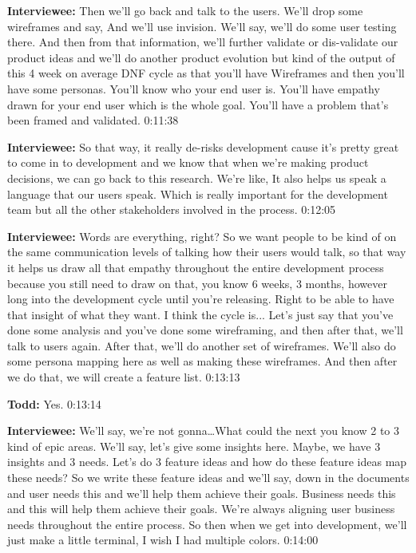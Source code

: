 \textbf{Interviewee:} Then we'll go back and talk to the users. We'll drop some wireframes and say,  And we'll use invision.  We'll say,  we'll do some user testing there.  And then from that information, we'll further validate or dis-validate our product ideas and we'll do another product evolution but kind of the output of this 4 week on average DNF cycle as that you'll have Wireframes and then you'll have some personas. You'll know who your end user is.  You'll have empathy drawn for your end user which is the whole goal. You'll have a problem that's been framed and validated.   0:11:38

\textbf{Interviewee:} So that way, it really de-risks development cause it's pretty great to come in to development and we know that when we're making product decisions, we can go back to this research.  We're like,  It also helps us speak a language that our users speak.  Which is really important for the development team but all the other stakeholders involved in the process.  0:12:05

\textbf{Interviewee:} Words are everything, right? So we want people to be kind of on the same communication levels of talking how their users would talk, so that way it helps us draw all that empathy throughout the entire development process because you still need to draw on that, you know 6 weeks, 3 months, however long into the development cycle until you're releasing. Right to be able to have that insight of what they want. I think the cycle is... Let's just say that you've done some analysis and you've done some wireframing, and then after that, we'll talk to users again.  After that, we'll do another set of wireframes. We'll also do some persona mapping here as well as making these wireframes.  And then after we do that, we will create a feature list.  0:13:13

\textbf{Todd:} Yes.  0:13:14

\textbf{Interviewee:} We'll say,  we're not gonna\ldots  What could the next you know 2 to 3 kind of epic areas. We'll say, let's give some insights here.  Maybe, we have 3 insights and 3 needs.  Let's do 3 feature ideas and how do these feature ideas map these needs?  So we write these feature ideas and we'll say, down in the documents and user needs this and we'll help them achieve their goals.  Business needs this and this will help them achieve their goals.  We're always aligning user business needs throughout the entire process. So then when we get into development, we'll just make a little terminal, I wish I had multiple colors.  0:14:00


